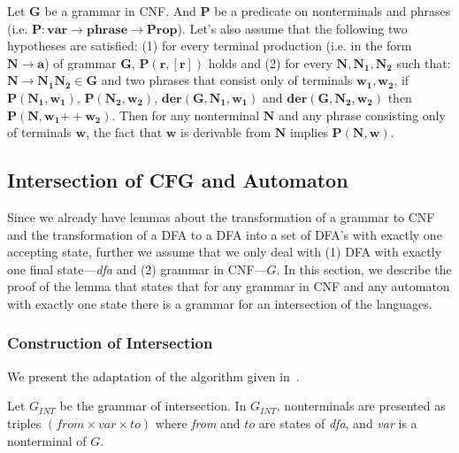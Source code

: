 \documentclass[runningheads]{llncs}
\begin{document}
\begin{lemma}
	Let $\boldsymbol{G}$ be a grammar in CNF. And $\boldsymbol{P}$ be a predicate on nonterminals and phrases (i.e. $\textbf{P}: \textbf{var} \to \textbf{phrase} \to \textbf{Prop}$).
	Let's also assume that the following two hypotheses are satisfied:
	(1) for every terminal production (i.e. in the form $\boldsymbol{N} \to \boldsymbol{a}$) of grammar $\boldsymbol{G}$, $\boldsymbol{P}(\boldsymbol{r}, [\boldsymbol{r}])$ holds and (2) for every $\boldsymbol{N}, \boldsymbol{N_1}, \boldsymbol{N_2}$ such that: $\boldsymbol{N} \to \boldsymbol{N_1 N_2} \in \boldsymbol{G}$ and two phrases that consist only of terminals $\boldsymbol{w_1}, \boldsymbol{w_2}$, if $\boldsymbol{P}(\boldsymbol{N_1}, \boldsymbol{w_1})$, $\boldsymbol{P}(\boldsymbol{N_2}, \boldsymbol{w_2})$, $\boldsymbol{der}(\boldsymbol{G}, \boldsymbol{N_1}, \boldsymbol{w_1})$ and $\boldsymbol{der}(\boldsymbol{G}, \boldsymbol{N_2}, \boldsymbol{w_2})$ then $\boldsymbol{P}(\boldsymbol{N}, \boldsymbol{w_1} \mathbin{++} \boldsymbol{w_2})$.
	Then for any nonterminal $\boldsymbol{N}$ and any phrase consisting only of terminals $\boldsymbol{w}$, the fact that $\boldsymbol{w}$ is derivable from $\boldsymbol{N}$ implies $\boldsymbol{P}(\boldsymbol{N},\boldsymbol{w})$.
\end{lemma}

\subsection{Intersection of CFG and Automaton}

Since we already have lemmas about the transformation of a grammar to CNF and the transformation of a DFA to a DFA into a set of DFA's with exactly one accepting state, further we assume that we only deal with (1) DFA with exactly one final state---\textit{dfa} and (2) grammar in CNF---$G$. In this section, we describe the proof of the lemma that states that for any grammar in CNF and any automaton with exactly one state there is a grammar for an intersection of the languages.

\subsubsection{Construction of Intersection}

We present the adaptation of the algorithm given in~\cite{beigelproof}.

Let $G_{INT}$ be the grammar of intersection. In $G_{INT}$, nonterminals are presented as triples $(\textit{from} \times var \times to) $ where \textit{from} and $to$ are states of \textit{dfa}, and \textit{var} is a nonterminal of $G$.
\end{document}
